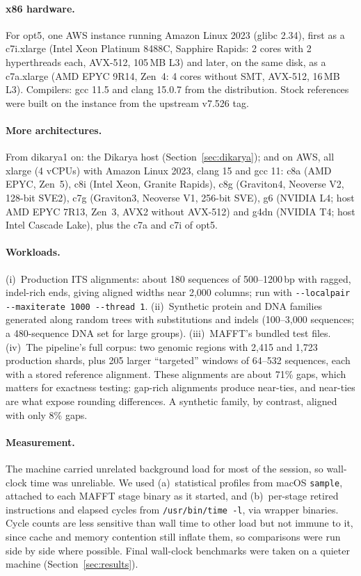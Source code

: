 \documentclass[11pt]{article}
\newcommand{\code}[1]{\texttt{#1}}
\begin{document}
\paragraph{x86 hardware.} For opt5, one AWS instance running Amazon Linux 2023 (glibc 2.34),
first as a c7i.xlarge (Intel Xeon Platinum 8488C, Sapphire Rapids: 2 cores with 2 hyperthreads
each, AVX-512, 105\,MB L3) and later, on the same disk, as a c7a.xlarge (AMD EPYC 9R14,
Zen~4: 4 cores without SMT, AVX-512, 16\,MB L3). Compilers: gcc 11.5 and clang 15.0.7 from the
distribution. Stock references were built on the instance from the upstream v7.526 tag.

\paragraph{More architectures.} From dikarya1 on: the Dikarya host (Section~\ref{sec:dikarya});
and on AWS, all xlarge (4 vCPUs) with Amazon Linux 2023, clang 15 and gcc 11: c8a (AMD EPYC,
Zen~5), c8i (Intel Xeon, Granite Rapids), c8g (Graviton4, Neoverse V2, 128-bit SVE2), c7g
(Graviton3, Neoverse V1, 256-bit SVE), g6 (NVIDIA L4; host AMD EPYC 7R13, Zen~3, AVX2 without
AVX-512) and g4dn (NVIDIA T4; host Intel Cascade Lake), plus the c7a and c7i of opt5.

\paragraph{Workloads.}
(i)~Production ITS alignments: about 180 sequences of 500--1200\,bp with ragged,
indel-rich ends, giving aligned widths near 2{,}000 columns; run with
\code{-{}-localpair -{}-maxiterate 1000 -{}-thread 1}.
(ii)~Synthetic protein and DNA families generated along random trees with substitutions and
indels (100--3{,}000 sequences; a 480-sequence DNA set for large groups).
(iii)~MAFFT's bundled test files.
(iv)~The pipeline's full corpus: two genomic regions with 2{,}415 and 1{,}723 production
shards, plus 205 larger ``targeted'' windows of 64--532 sequences, each with a stored
reference alignment. These alignments are about 71\% gaps, which matters for exactness
testing: gap-rich alignments produce near-ties, and near-ties are what expose rounding
differences. A synthetic family, by contrast, aligned with only 8\% gaps.

\paragraph{Measurement.} The machine carried unrelated background load for most of the
session, so wall-clock time was unreliable. We used (a)~statistical profiles from macOS
\code{sample}, attached to each MAFFT stage binary as it started, and (b)~per-stage retired
instructions and elapsed cycles from \code{/usr/bin/time -l}, via wrapper binaries. Cycle
counts are less sensitive than wall time to other load but not immune to it, since cache
and memory contention still inflate them, so comparisons were run side by side where possible. Final
wall-clock benchmarks were taken on a quieter machine (Section~\ref{sec:results}).
\end{document}
